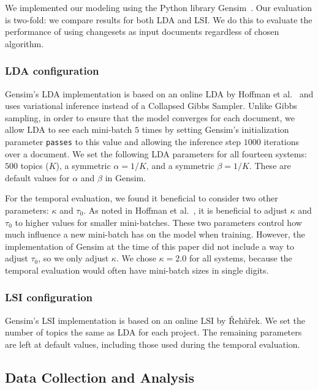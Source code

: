 We implemented our modeling using the Python library Gensim~\cite{Gensim}.
Our evaluation is two-fold: we compare results for both LDA and LSI.
We do this to evaluate the performance of using changesets as input
documents regardless of chosen algorithm.

\subsubsection{LDA configuration}

Gensim's LDA implementation is based on an online LDA by Hoffman et al.~\cite{Hoffman-etal:2010}
and uses variational inference instead of a Collapsed Gibbs Sampler.
Unlike Gibbs sampling, in order to ensure that the model converges for each document,
we allow LDA to see each mini-batch $5$ times by setting Gensim's initialization parameter \texttt{passes} to this value
and allowing the inference step $1000$ iterations over a document.
We set the following LDA parameters for all fourteen systems:
$500$ topics ($K$), a symmetric $\alpha=1/K$, and a symmetric $\beta=1/K$.
These are default values for $\alpha$ and $\beta$ in Gensim.

For the temporal evaluation, we found it beneficial to consider two other parameters: $\kappa$ and $\tau_0$.
As noted in Hoffman et al.~\cite{Hoffman-etal:2010}, it is beneficial to
adjust $\kappa$ and $\tau_0$ to higher values for smaller mini-batches.
These two parameters control how much influence a new mini-batch has on the model when training.
However, the implementation of Gensim at the time of this paper did not
include a way to adjust $\tau_0$, so we only adjust $\kappa$.
We chose $\kappa=2.0$ for all systems, because the temporal evaluation
would often have mini-batch sizes in single digits.

\subsubsection{LSI configuration}

Gensim's LSI implementation is based on an online LSI by {\v R}eh{\r u}{\v r}ek\cite{Radim:2011}.
We set the number of topics the same as LDA for each project.
The remaining parameters are left at default values, including those used
during the temporal evaluation.




\subsection{Data Collection and Analysis}

